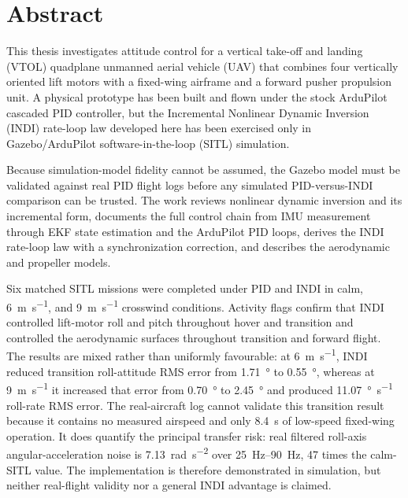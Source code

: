 \documentclass{article}
\begin{document}
\newpage
\renewcommand{\listtablename}{LIST OF TABLES}
\listoftables
\renewcommand{\listfigurename}{LIST OF FIGURES}
\listoffigures
\newpage
{}

\section*{Abstract}
This thesis investigates attitude control for a vertical take-off and landing (VTOL) quadplane unmanned aerial vehicle (UAV) that combines four vertically oriented lift motors with a fixed-wing airframe and a forward pusher propulsion unit. A physical prototype has been built and flown under the stock ArduPilot cascaded PID controller, but the Incremental Nonlinear Dynamic Inversion (INDI) rate-loop law developed here has been exercised only in Gazebo/ArduPilot software-in-the-loop (SITL) simulation.

Because simulation-model fidelity cannot be assumed, the Gazebo model must be validated against real PID flight logs before any simulated PID-versus-INDI comparison can be trusted. The work reviews nonlinear dynamic inversion and its incremental form, documents the full control chain from IMU measurement through EKF state estimation and the ArduPilot PID loops, derives the INDI rate-loop law with a synchronization correction, and describes the aerodynamic and propeller models.

Six matched SITL missions were completed under PID and INDI in calm, \SI{6}{\meter\per\second}, and \SI{9}{\meter\per\second} crosswind conditions. Activity flags confirm that INDI controlled lift-motor roll and pitch throughout hover and transition and controlled the aerodynamic surfaces throughout transition and forward flight. The results are mixed rather than uniformly favourable: at \SI{6}{\meter\per\second}, INDI reduced transition roll-attitude RMS error from \SI{1.71}{\degree} to \SI{0.55}{\degree}, whereas at \SI{9}{\meter\per\second} it increased that error from \SI{0.70}{\degree} to \SI{2.45}{\degree} and produced \SI{11.07}{\degree\per\second} roll-rate RMS error. The real-aircraft log cannot validate this transition result because it contains no measured airspeed and only \SI{8.4}{\second} of low-speed fixed-wing operation. It does quantify the principal transfer risk: real filtered roll-axis angular-acceleration noise is \SI{7.13}{\radian\per\second\squared} over \SIrange{25}{90}{\hertz}, 47 times the calm-SITL value. The implementation is therefore demonstrated in simulation, but neither real-flight validity nor a general INDI advantage is claimed.
\end{document}
